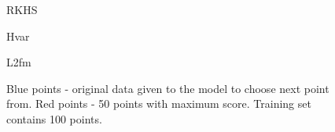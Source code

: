 \documentclass[a4paper]{article}
\begin{document}
\begin{figure}[h]
\begin{minipage}[h]{0.49\linewidth}
\end{minipage}
\hfill
\begin{minipage}[h]{0.49\linewidth}
 RKHS
\end{minipage}
\vfill
\begin{minipage}[h]{0.49\linewidth}
 Hvar
\end{minipage}
\hfill
\begin{minipage}[h]{0.49\linewidth}
 L2fm
\end{minipage}
\caption{Blue points - original data given to the model to choose next point from. Red points - 50 points with maximum score. Training set contains 100 points.}
\label{scoreplots}
\end{figure}
\end{document}
